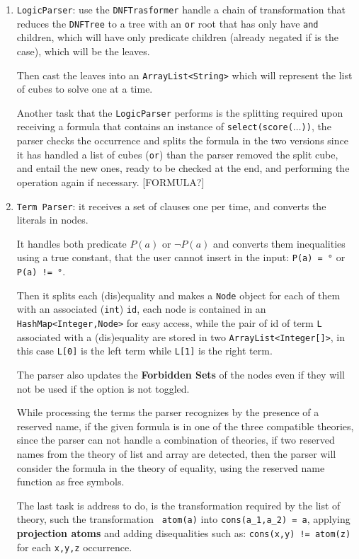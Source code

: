 \documentclass[11pt,a4paper]{article}
\begin{document}
\begin{enumerate}
        \item \texttt{LogicParser}: use the \texttt{DNFTrasformer} handle a chain of transformation that reduces the \texttt{DNFTree} to a tree with an \texttt{or} root that has only have \texttt{and} children, which will have only predicate children (already negated if is the case), which will be the leaves.

        Then cast the leaves into an \texttt{ArrayList<String>} which will represent the list of cubes to solve one at a time.

        Another task that the \texttt{LogicParser} performs is the splitting required upon receiving a formula that contains an instance of \texttt{select(score($\dots$))}, the parser checks the occurrence and splits the formula in the two versions since it has handled a list of cubes (\texttt{or}) than the parser removed the split cube, and entail the new ones, ready to be checked at the end, and performing the operation again if necessary.
        [FORMULA?]

        \item \texttt{Term Parser}: it receives a set of clauses one per time, and converts the literals in nodes.

        It handles both predicate $P(a)$ or $\lnot P(a)$ and converts them inequalities using a true constant, that the user cannot insert in the input: \texttt{P(a) = °} or \texttt{P(a) != °}.

        Then it splits each (dis)equality and makes a \texttt{Node} object for each of them with an associated (\texttt{int}) \texttt{id}, each node is contained in an \texttt{HashMap<Integer,Node>} for easy access, while the pair of id of term \texttt{L} associated with a (dis)equality are stored in two \texttt{ArrayList<Integer[]>}, in this case \texttt{L[0]} is the left term while \texttt{L[1]} is the right term. 
        
        The parser also updates the \textbf{Forbidden Sets} of the nodes even if they will not be used if the option is not toggled.

        While processing the terms the parser recognizes by the presence of a reserved name, if the given formula is in one of the three compatible theories, since the parser can not handle a combination of theories, if two reserved names from the theory of list and array are detected, then the parser will consider the formula in the theory of equality, using the reserved name function as free symbols.
        
        The last task is address to do, is the transformation required by the list of theory, such the transformation \texttt{~atom(a)} into \texttt{cons(a\_1,a\_2) = a}, applying \textbf{projection atoms} and adding disequalities such as: \texttt{cons(x,y) != atom(z)} for each \texttt{x,y,z} occurrence. 

    \end{enumerate}
\end{document}
